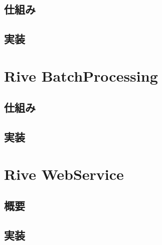 \subsection{仕組み}
\subsection{実装}

\section{Rive BatchProcessing}
\subsection{仕組み}
\subsection{実装}

\section{Rive WebService}
\subsection{概要}
\subsection{実装}
